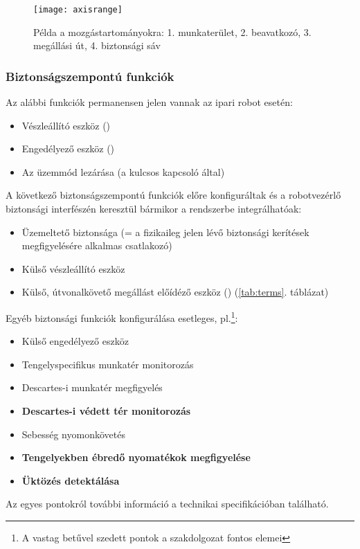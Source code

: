 \documentclass[../documentation.tex]{subfiles}
\begin{document}
\begin{figure}[H]
\centering
\texttt{[image: axisrange]}
\caption{Példa a mozgástartományokra: 1. munkaterület, 2. beavatkozó, 3. megállási út, 4. biztonsági sáv}
\label{fig:axisrange}
\end{figure}

\subsubsection{Biztonságszempontú funkciók}
\label{sec:safetyfunctions}
Az alábbi funkciók permanensen jelen vannak az ipari robot esetén:
\begin{itemize}
	\item Vészleállító eszköz ()
	\item Engedélyező eszköz ()
	\item Az üzemmód lezárása (a kulcsos kapcsoló által)
\end{itemize}
A következő biztonságszempontú funkciók előre konfiguráltak és a robotvezérlő biztonsági interfészén keresztül bármikor a rendszerbe integrálhatóak:
\begin{itemize}
	\item Üzemeltető biztonsága (= a fizikaileg jelen lévő biztonsági kerítések megfigyelésére alkalmas csatlakozó)
	\item Külső vészleállító eszköz
	\item Külső, útvonalkövető megállást előídéző eszköz () (\ref{tab:terms}. táblázat)
\end{itemize}
Egyéb biztonsági funkciók konfigurálása esetleges, pl.\footnote{A vastag betűvel szedett pontok a szakdolgozat fontos elemei}:
\begin{itemize}
	\item Külső engedélyező eszköz
	\item Tengelyspecifikus munkatér monitorozás
	\item Descartes-i munkatér megfigyelés
	\item \textbf{Descartes-i védett tér monitorozás}
	\item Sebesség nyomonkövetés
	\item \textbf{Tengelyekben ébredő nyomatékok megfigyelése}
	\item \textbf{Üktözés detektálása}
\end{itemize}
Az egyes pontokról további információ a technikai specifikációban található\cite{sunrisemanual}.
\end{document}
